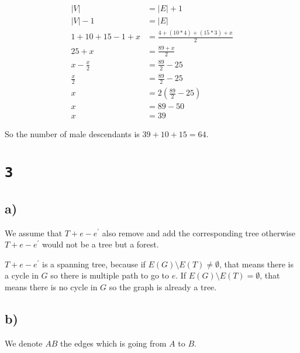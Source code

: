 \documentclass[a4paper,11pt]{report}
\begin{document}
\begin{align*}
  |V| &= |E| + 1 \\
  |V| - 1 &= |E| \\
  1 + 10 + 15 - 1 + x &= \frac{4 + (10*4) + (15*3) + x}{2}\\
  25 + x &=  \frac{89 + x}{2}\\
  x - \frac{x}{2} &= \frac{89}{2} - 25\\
  \frac{x}{2} &=  \frac{89}{2} - 25\\
  x &= 2 (\frac{89}{2} - 25) \\
  x &= 89 - 50 \\
  x &= 39
\end{align*}

So the number of male descendants is $39 + 10 + 15 = 64$.

\section*{\texttt{3}}

\subsection*{a)}

We assume that $T + e - e^\prime$ also remove and add the corresponding tree otherwise
$T + e - e^\prime$ would not be a tree but a forest.

$T + e - e^\prime$ is a spanning tree, because if $E(G) \setminus E(T) \neq \emptyset$,
that means there is a cycle in $G$ so there is multiple path to go to $e$. If
$E(G) \setminus E(T) = \emptyset$, that means there is no cycle in $G$ so the
graph is already a tree.

\subsection*{b)}

We denote $AB$ the edges which is going from $A$ to $B$.

\begin{center}
\end{center}
\end{document}
